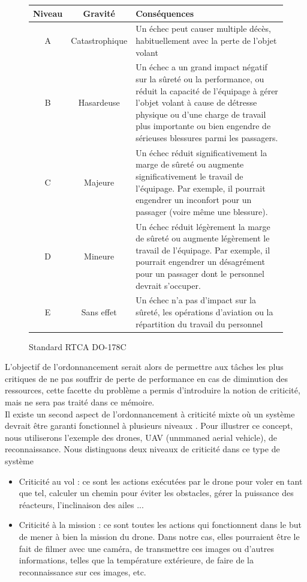\documentclass[12pt,a4paper,oneside]{book}
\theoremstyle{break}
\theoremstyle{breakplain}
\begin{document}
\begin{figure}[h]
\begin{tabularx}{\textwidth}{|c|c|X|}
\hline
Niveau & Gravité & Conséquences\\
\hline
A & Catastrophique & Un échec peut causer multiple décès, habituellement avec la perte de l'objet volant\\
\hline
B & Hasardeuse & Un échec a un grand impact négatif sur la sûreté ou la performance, ou réduit la capacité de l'équipage à gérer l'objet volant à cause de détresse physique ou d'une charge de travail plus importante ou bien engendre de sérieuses blessures parmi les passagers.\\
\hline
C & Majeure & Un échec réduit significativement la marge de sûreté ou augmente significativement le travail de l'équipage. Par exemple, il pourrait engendrer un inconfort pour un passager (voire même une blessure).\\
\hline
D & Mineure & Un échec réduit légèrement la marge de sûreté ou augmente légèrement le travail de l'équipage. Par exemple, il pourrait engendrer un désagrément pour un passager dont le personnel devrait s'occuper.\\
\hline
E & Sans effet & Un échec n'a pas d'impact sur la sûreté, les opérations d'aviation ou la répartition du travail du personnel\\
\hline
\end{tabularx}
\caption{Standard RTCA DO-178C \cite{nordhoff2012do178}}
\label{do178}
\end{figure}

L'objectif de l'ordonnancement serait alors de permettre aux tâches les plus critiques de ne pas souffrir de perte de performance en cas de diminution des ressources, cette facette du problème a permis d'introduire la notion de criticité, mais ne sera pas traité dans ce mémoire.\\

Il existe un second aspect de l'ordonnancement à criticité mixte où un système devrait être garanti fonctionnel à plusieurs niveaux \cite{barhorst2009research}. Pour illustrer ce concept, nous utiliserons l'exemple des drones, UAV (unmmaned aerial vehicle), de reconnaissance. Nous distinguons deux niveaux de criticité dans ce type de système
\begin{itemize}
\item Criticité au vol : ce sont les actions exécutées par le drone pour voler en tant que tel, calculer un chemin pour éviter les obstacles, gérer la puissance des réacteurs, l'inclinaison des ailes ...
\item Criticité à la mission : ce sont toutes les actions qui fonctionnent dans le but de mener à bien la mission du drone. Dans notre cas, elles pourraient être le fait de filmer avec une caméra, de transmettre ces images ou d'autres informations, telles que la température extérieure, de faire de la reconnaissance sur ces images, etc.\\
\end{itemize}
\end{document}
